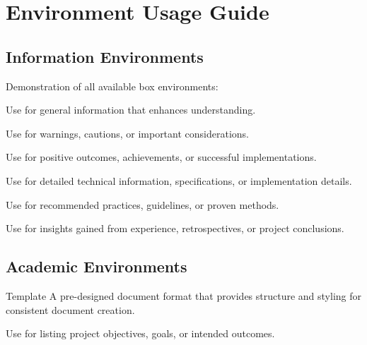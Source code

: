 \documentclass{internshipreport}
\begin{document}
\chapter{Environment Usage Guide}
\label{app:environments}

\section{Information Environments}

Demonstration of all available box environments:

\begin{infobox}
Use for general information that enhances understanding.
\end{infobox}

\begin{warningbox}
Use for warnings, cautions, or important considerations.
\end{warningbox}

\begin{successbox}
Use for positive outcomes, achievements, or successful implementations.
\end{successbox}

\begin{technicalbox}
Use for detailed technical information, specifications, or implementation details.
\end{technicalbox}

\begin{bestpractice}
Use for recommended practices, guidelines, or proven methods.
\end{bestpractice}

\begin{lessonslearned}
Use for insights gained from experience, retrospectives, or project conclusions.
\end{lessonslearned}

\section{Academic Environments}

\begin{definition}{Template}
A pre-designed document format that provides structure and styling for consistent document creation.
\end{definition}

\begin{objectives}
Use for listing project objectives, goals, or intended outcomes.
\end{objectives}
\end{document}

